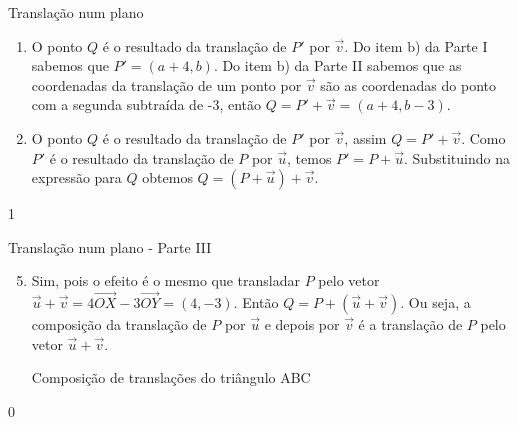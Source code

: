 \begin{answer}{Translação num plano}
{\begin{enumerate}
\item {} 
O ponto \(Q\) é o resultado da translação de \(P'\) por \(\vec{v}\). Do item b) da Parte I sabemos que \(P' = (a + 4,b)\). Do item b) da Parte II sabemos que as coordenadas da translação de um ponto por \(\vec{v}\) são as coordenadas do ponto com a segunda subtraída de -3, então \(Q = P' + \vec{v} = (a+4,b-3)\).

\item {} 
O ponto \(Q\) é o resultado da translação de \(P'\) por \(\vec{v}\), assim \(Q = P' + \vec{v}\). Como \(P'\) é o resultado da translação de \(P\) por \(\vec{u}\), temos \(P'=P + \vec{u}\). Substituindo na expressão para \(Q\) obtemos \(Q= (P+\vec{u}) + \vec{v}\).


\end{enumerate}
}{1}
\end{answer}
\begin{answer}{Translação num plano - Parte III}
{
\begin{enumerate}\setcounter{enumi}{4}
\item {} 
Sim, pois o efeito é o mesmo que transladar \(P\) pelo vetor \(\vec{u} + \vec{v} = 4\overrightarrow{OX} - 3 \overrightarrow{OY} = (4,-3)\). Então \(Q=P+(\vec{u}+\vec{v})\). Ou seja, a composição da translação de \(P\) por \(\vec{u}\) e depois por \(\vec{v}\) é a translação de \(P\) pelo vetor \(\vec{u}+\vec{v}\).

\begin{marginfigure}[H]
\centering

\caption{Composição de translações do triângulo ABC}
\end{marginfigure}
\end{enumerate}
}{0}
\end{answer}
